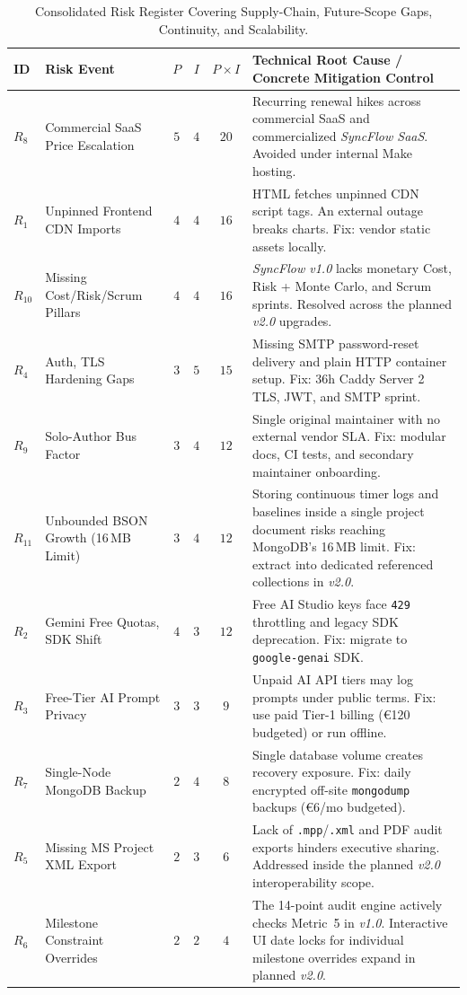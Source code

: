 \begin{table}[H]
\centering
\tiny
\renewcommand{\arraystretch}{1.18}
\caption*{Consolidated Risk Register Covering Supply-Chain, Future-Scope Gaps, Continuity, and Scalability.}
\begin{tabularx}{\textwidth}{l l c c c X}
\toprule
\textbf{ID} & \textbf{Risk Event} & \textbf{$P$} & \textbf{$I$} & \textbf{$P \times I$} & \textbf{Technical Root Cause / Concrete Mitigation Control} \\
\midrule
$R_8$ & Commercial SaaS Price Escalation & $5$ & $4$ & $20$ & Recurring renewal hikes across commercial SaaS and commercialized \textit{SyncFlow SaaS}. Avoided under internal Make hosting. \\
$R_1$ & Unpinned Frontend CDN Imports & $4$ & $4$ & $16$ & HTML fetches unpinned CDN script tags. An external outage breaks charts. Fix: vendor static assets locally. \\
$R_{10}$ & Missing Cost/Risk/Scrum Pillars & $4$ & $4$ & $16$ & \textit{SyncFlow v1.0} lacks monetary Cost, Risk + Monte Carlo, and Scrum sprints. Resolved across the planned \textit{v2.0} upgrades. \\
$R_4$ & Auth, TLS Hardening Gaps & $3$ & $5$ & $15$ & Missing SMTP password-reset delivery and plain HTTP container setup. Fix: 36h Caddy Server 2 TLS, JWT, and SMTP sprint. \\
$R_9$ & Solo-Author Bus Factor & $3$ & $4$ & $12$ & Single original maintainer with no external vendor SLA. Fix: modular docs, CI tests, and secondary maintainer onboarding. \\
$R_{11}$ & Unbounded BSON Growth (16\,MB Limit) & $3$ & $4$ & $12$ & Storing continuous timer logs and baselines inside a single project document risks reaching MongoDB's 16\,MB limit. Fix: extract into dedicated referenced collections in \textit{v2.0}. \\
$R_2$ & Gemini Free Quotas, SDK Shift & $4$ & $3$ & $12$ & Free AI Studio keys face \texttt{429} throttling and legacy SDK deprecation. Fix: migrate to \texttt{google-genai} SDK. \\
$R_3$ & Free-Tier AI Prompt Privacy & $3$ & $3$ & $9$ & Unpaid AI API tiers may log prompts under public terms. Fix: use paid Tier-1 billing (€120 budgeted) or run offline. \\
$R_7$ & Single-Node MongoDB Backup & $2$ & $4$ & $8$ & Single database volume creates recovery exposure. Fix: daily encrypted off-site \texttt{mongodump} backups (€6/mo budgeted). \\
$R_5$ & Missing MS Project XML Export & $2$ & $3$ & $6$ & Lack of \texttt{.mpp}/\texttt{.xml} and PDF audit exports hinders executive sharing. Addressed inside the planned \textit{v2.0} interoperability scope. \\
$R_6$ & Milestone Constraint Overrides & $2$ & $2$ & $4$ & The 14-point audit engine actively checks Metric~5 in \textit{v1.0}. Interactive UI date locks for individual milestone overrides expand in planned \textit{v2.0}. \\
\bottomrule
\end{tabularx}
\end{table}

